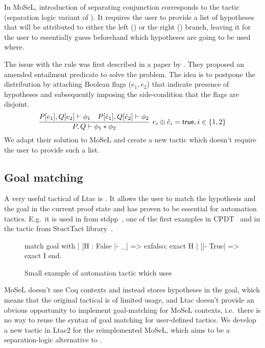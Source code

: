 In MoSeL, introduction of separating conjunction corresponds to the  tactic (separation logic variant of ).
It requires the user to provide a list of hypotheses that will be attributed to either the left () or the right () branch, leaving it for the user to essentially guess beforehand which hypotheses are going to be used where.

The issue with the rule was first described in a paper by \citet{harlandResourceDistributionBooleanConstraints2003}.
They proposed an amended entailment predicate to solve the problem.
The idea is to postpone the distribution by attaching Boolean flags (\(e_1, e_2\)) that indicate presence of hypotheses and subsequently imposing the side-condition that the flags are disjoint.
\[\infer[e_i \oplus \hat{e}_i = \true, i \in \{1,2\}]
        {P, Q \vdash \phi_1 \ast \phi_2}
        {P[e_1], Q[e_2] \vdash \phi_1 &
         P[\hat{e}_1], Q[\hat{e}_2] \vdash \phi_2} \]
We adapt their solution to MoSeL and create a new  tactic which doesn't require the user to provide such a list.

\subsection{Goal matching}
\label{sec:goal-matching}

A very useful tactical of Ltac is .
It allows the user to match the hypothesis and the goal in the current proof state and has proven to be essential for automation tactics.
E.g.\ it is used in  from stdpp~\cite{std++developersandcontributorsStdpp}, one of the first examples in CPDT~\cite{chlipalaCertifiedProgrammingDependent2013} and in the  tactic from StuctTact library~\cite{uwplse-structtactdevelopmentteamStructTact2020}.

\begin{figure}[H]
\begin{coq}
match goal with
| [H : False |- _] => exfalso; exact H
| [|- True] => exact I
end.
\end{coq}
  \caption{Small example of automation tactic which uses }
  \label{fig:match-goal-example-intro}
\end{figure}

MoSeL doesn't use Coq contexts and instead stores hypotheses in the goal, which means that the original tactical is of limited usage, and Ltac doesn't provide an obvious opportunity to implement goal-matching for MoSeL contexts, i.e.\ there is no way to reuse the syntax of goal matching for user-defined tactics.
We develop a new tactic  in Ltac2 for the reimplemented MoSeL, which aims to be a separation-logic alternative to .

